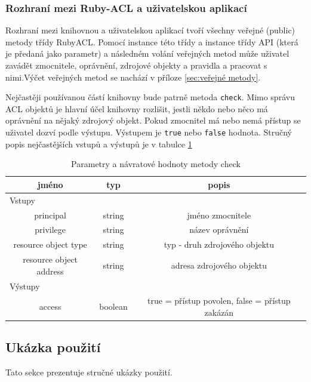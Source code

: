 
\subsubsection{Rozhraní mezi Ruby-ACL a uživatelskou aplikací}
Rozhraní mezi knihovnou a uživatelskou aplikací tvoří všechny veřejné (public) metody třídy RubyACL. Pomocí instance této třídy a instance třídy API (která je předaná jako parametr) a následném volání veřejných metod může uživatel zavádět zmocnitele, oprávnění, zdrojové objekty a pravidla a pracovat s nimi.Výčet veřejných metod se nachází v příloze \ref{sec:veřejné metody}.

Nejčastěji používanou částí knihovny bude patrně metoda \verb|check|. Mimo správu ACL objektů je hlavní účel knihovny rozlišit, jestli někdo nebo něco má oprávnění na nějaký zdrojový objekt. Pokud zmocnitel má nebo nemá přístup se uživatel dozví podle výstupu. Výstupem je \verb|true| nebo \verb|false| hodnota. Stručný popis nejčastějších vstupů a výstupů je v tabulce \ref{tab:tab3}

\begin{table}%
\centering
\begin{tabular}{|c|c|c|}
\hline
\textbf{jméno} & \textbf{typ} & \textbf{popis}\\
\hline
\multicolumn{3}{|l|}{Vstupy} \\
\hline
principal & string & jméno zmocnitele\\
\hline
privilege & string & název oprávnění\\
\hline
resource object type & string & typ - druh zdrojového objektu\\
\hline
resource object address & string & adresa zdrojového objektu\\
\hline
\hline
\multicolumn{3}{|l|}{Výstupy} \\
\hline
access & boolean & true = přístup povolen, false = přístup zakázán\\
\hline
\end{tabular}
\caption{Parametry a návratové hodnoty metody check} %
\label{tab:tab3}
\end{table}


\subsection{Ukázka použití}
\label{Ukázka použití}
Tato sekce prezentuje stručné ukázky použití.

